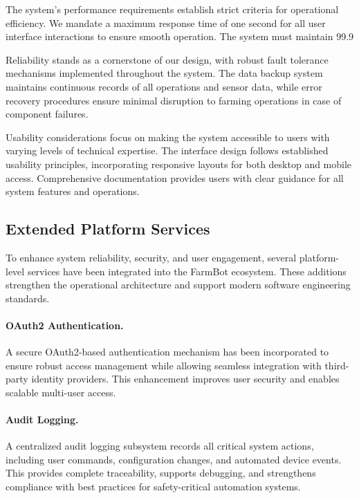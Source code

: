 The system's performance requirements establish strict criteria for operational efficiency. We mandate a maximum response time of one second for all user interface interactions to ensure smooth operation. The system must maintain 99.9%

Reliability stands as a cornerstone of our design, with robust fault tolerance mechanisms implemented throughout the system. The data backup system maintains continuous records of all operations and sensor data, while error recovery procedures ensure minimal disruption to farming operations in case of component failures.

Usability considerations focus on making the system accessible to users with varying levels of technical expertise. The interface design follows established usability principles, incorporating responsive layouts for both desktop and mobile access. Comprehensive documentation provides users with clear guidance for all system features and operations.

\subsection{Extended Platform Services}

To enhance system reliability, security, and user engagement, several platform-level services have been integrated into the FarmBot ecosystem. These additions strengthen the operational architecture and support modern software engineering standards.

\paragraph{OAuth2 Authentication.}
A secure OAuth2-based authentication mechanism has been incorporated to ensure robust access management while allowing seamless integration with third-party identity providers. This enhancement improves user security and enables scalable multi-user access.

\paragraph{Audit Logging.}
A centralized audit logging subsystem records all critical system actions, including user commands, configuration changes, and automated device events. This provides complete traceability, supports debugging, and strengthens compliance with best practices for safety-critical automation systems.

